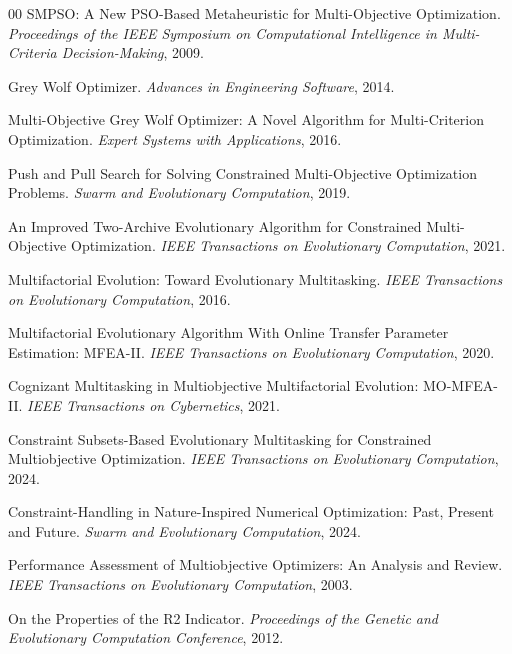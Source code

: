 \documentclass[a4paper,fleqn]{cas-dc}
\begin{document}
\begin{thebibliography}{00}
SMPSO: A New PSO-Based Metaheuristic for Multi-Objective Optimization.
\textit{Proceedings of the IEEE Symposium on Computational Intelligence in Multi-Criteria Decision-Making}, 2009.

Grey Wolf Optimizer.
\textit{Advances in Engineering Software}, 2014.

Multi-Objective Grey Wolf Optimizer: A Novel Algorithm for Multi-Criterion Optimization.
\textit{Expert Systems with Applications}, 2016.

Push and Pull Search for Solving Constrained Multi-Objective Optimization Problems.
\textit{Swarm and Evolutionary Computation}, 2019.

An Improved Two-Archive Evolutionary Algorithm for Constrained Multi-Objective Optimization.
\textit{IEEE Transactions on Evolutionary Computation}, 2021.

Multifactorial Evolution: Toward Evolutionary Multitasking.
\textit{IEEE Transactions on Evolutionary Computation}, 2016.

Multifactorial Evolutionary Algorithm With Online Transfer Parameter Estimation: MFEA-II.
\textit{IEEE Transactions on Evolutionary Computation}, 2020.

Cognizant Multitasking in Multiobjective Multifactorial Evolution: MO-MFEA-II.
\textit{IEEE Transactions on Cybernetics}, 2021.

Constraint Subsets-Based Evolutionary Multitasking for Constrained Multiobjective Optimization.
\textit{IEEE Transactions on Evolutionary Computation}, 2024.

Constraint-Handling in Nature-Inspired Numerical Optimization: Past, Present and Future.
\textit{Swarm and Evolutionary Computation}, 2024.

Performance Assessment of Multiobjective Optimizers: An Analysis and Review.
\textit{IEEE Transactions on Evolutionary Computation}, 2003.

On the Properties of the R2 Indicator.
\textit{Proceedings of the Genetic and Evolutionary Computation Conference}, 2012.

\end{thebibliography}
\end{document}
